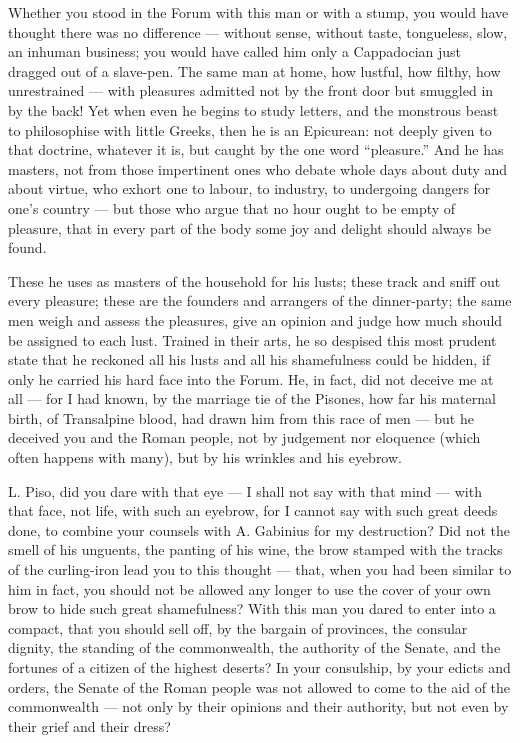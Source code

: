  Whether you stood in the Forum with this man or with a stump, you would have thought there was no difference --- without sense, without taste, tongueless, slow, an inhuman business; you would have called him only a Cappadocian just dragged out of a slave-pen. The same man at home, how lustful, how filthy, how unrestrained --- with pleasures admitted not by the front door but smuggled in by the back! Yet when even he begins to study letters, and the monstrous beast to philosophise with little Greeks, then he is an Epicurean: not deeply given to that doctrine, whatever it is, but caught by the one word ``pleasure.'' And he has masters, not from those impertinent ones who debate whole days about duty and about virtue, who exhort one to labour, to industry, to undergoing dangers for one's country --- but those who argue that no hour ought to be empty of pleasure, that in every part of the body some joy and delight should always be found.

 These he uses as masters of the household for his lusts; these track and sniff out every pleasure; these are the founders and arrangers of the dinner-party; the same men weigh and assess the pleasures, give an opinion and judge how much should be assigned to each lust. Trained in their arts, he so despised this most prudent state that he reckoned all his lusts and all his shamefulness could be hidden, if only he carried his hard face into the Forum. He, in fact, did not deceive me at all --- for I had known, by the marriage tie of the Pisones, how far his maternal birth, of Transalpine blood, had drawn him from this race of men --- but he deceived you and the Roman people, not by judgement nor eloquence (which often happens with many), but by his wrinkles and his eyebrow.

 L. Piso, did you dare with that eye --- I shall not say with that mind --- with that face, not life, with such an eyebrow, for I cannot say with such great deeds done, to combine your counsels with A. Gabinius for my destruction? Did not the smell of his unguents, the panting of his wine, the brow stamped with the tracks of the curling-iron lead you to this thought --- that, when you had been similar to him in fact, you should not be allowed any longer to use the cover of your own brow to hide such great shamefulness? With this man you dared to enter into a compact, that you should sell off, by the bargain of provinces, the consular dignity, the standing of the commonwealth, the authority of the Senate, and the fortunes of a citizen of the highest deserts? In your consulship, by your edicts and orders, the Senate of the Roman people was not allowed to come to the aid of the commonwealth --- not only by their opinions and their authority, but not even by their grief and their dress?

